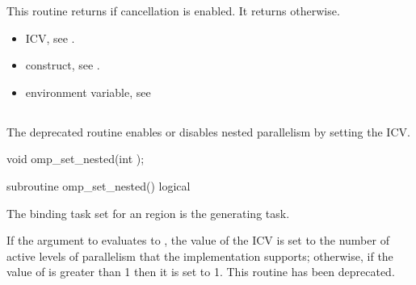 \effect
This routine returns  if cancellation is enabled. It returns  otherwise.

\crossreferences
\begin{itemize}
\item {} ICV, see
.

\item {} construct, see .

\item {} environment variable, see
\end{itemize}









\subsection{}
\label{subsec:omp_set_nested}
\summary
The deprecated  routine enables or disables nested parallelism by setting the
 ICV.


\format
\begin{ccppspecific}
\begin{ompcFunction}
void omp_set_nested(int );
\end{ompcFunction}
\end{ccppspecific}

\begin{fortranspecific}
\begin{ompfSubroutine}
subroutine omp_set_nested()
logical 
\end{ompfSubroutine}
\end{fortranspecific}

\binding
The binding task set for an  region is the generating task.

\effect

If the argument to  evaluates to , the value of
the  ICV is set to the number of active levels of
parallelism that the implementation supports; otherwise, if the value of
 is greater than 1 then it is set to 1.
This routine has been deprecated.

